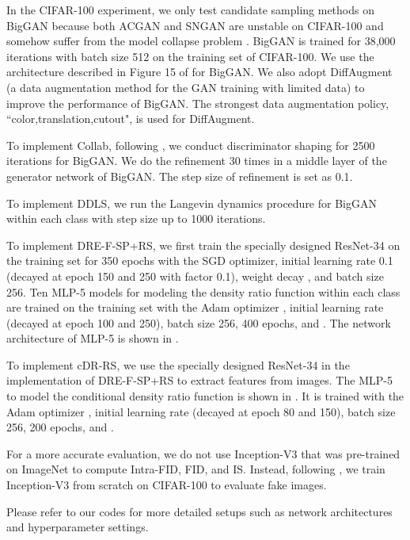 \documentclass[final,12pt, 3p,times]{elsarticle}
\begin{document}
In the CIFAR-100 experiment, we only test candidate sampling methods on BigGAN because both ACGAN and SNGAN are unstable on CIFAR-100 and somehow suffer from the model collapse problem \cite{gulrajani2017improved}. BigGAN is trained for 38,000 iterations with batch size 512 on the training set of CIFAR-100. We use the architecture described in Figure 15 of \cite{brock2018large} for BigGAN. We also adopt DiffAugment \cite{zhao2020differentiable} (a data augmentation method for the GAN training with limited data) to improve the performance of BigGAN. The strongest data augmentation policy, ``color,translation,cutout", is used for DiffAugment.

To implement Collab, following \cite{liu2020collaborative}, we conduct discriminator shaping for 2500 iterations for BigGAN. We do the refinement 30 times in a middle layer of the generator network of BigGAN. The step size of refinement is set as 0.1. 

To implement DDLS, we run the Langevin dynamics procedure for BigGAN within each class with step size  up to 1000 iterations.

To implement DRE-F-SP+RS, we first train the specially designed ResNet-34 on the training set for 350 epochs with the SGD optimizer, initial learning rate 0.1 (decayed at epoch 150 and 250 with factor 0.1), weight decay , and batch size 256. Ten MLP-5 models for modeling the density ratio function within each class are trained on the training set with the Adam optimizer \cite{kingma2014adam}, initial learning rate  (decayed at epoch 100 and 250), batch size 256, 400 epochs, and . The network architecture of MLP-5 is shown in . 

To implement cDR-RS, we use the specially designed ResNet-34 in the implementation of DRE-F-SP+RS to extract features from images. The MLP-5 to model the conditional density ratio function is shown in . It is trained with the Adam optimizer \cite{kingma2014adam}, initial learning rate  (decayed at epoch 80 and 150), batch size 256, 200 epochs, and .

For a more accurate evaluation, we do not use Inception-V3 \cite{szegedy2016rethinking} that was pre-trained on ImageNet \cite{imagenet_cvpr09} to compute Intra-FID, FID, and IS. Instead, following \cite{ding2020subsampling}, we train Inception-V3 from scratch on CIFAR-100 to evaluate fake images. 

Please refer to our codes for more detailed setups such as network architectures and hyperparameter settings.
\end{document}

